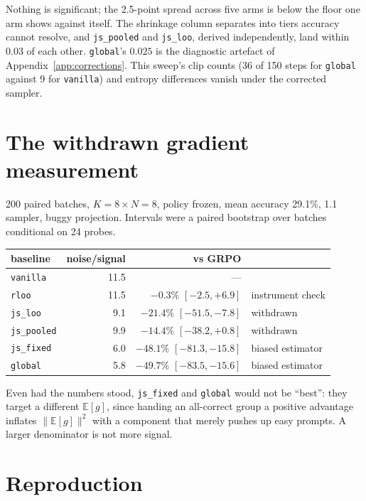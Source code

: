 \documentclass{article}
\newcommand{\E}{\mathbb{E}}
\newcommand{\arm}[1]{\texttt{#1}}
\begin{document}
Nothing is significant; the 2.5-point spread across five arms is below the
floor one arm shows against itself. The shrinkage column separates into
tiers accuracy cannot resolve, and \arm{js\_pooled} and \arm{js\_loo},
derived independently, land within $0.03$ of each other. \arm{global}'s
$0.025$ is the diagnostic artefact of Appendix~\ref{app:corrections}. This
sweep's clip counts (36 of 150 steps for \arm{global} against 9 for
\arm{vanilla}) and entropy differences vanish under the corrected sampler.

\section{The withdrawn gradient measurement}
\label{app:gradvar}

200 paired batches, $K=8\times N=8$, policy frozen, mean accuracy 29.1\%,
1.1 sampler, buggy projection. Intervals were a paired bootstrap over
batches conditional on 24 probes.

\begin{center}\small
\begin{tabular}{lrrl}
\toprule
baseline & noise/signal & vs GRPO & \\
\midrule
\arm{vanilla}    & 11.5 & ---                      & \\
\arm{rloo}       & 11.5 & $-0.3\%$ $[-2.5,+6.9]$   & instrument check \\
\arm{js\_loo}    & 9.1  & $-21.4\%$ $[-51.5,-7.8]$ & withdrawn \\
\arm{js\_pooled} & 9.9  & $-14.4\%$ $[-38.2,+0.8]$ & withdrawn \\
\arm{js\_fixed}  & 6.0  & $-48.1\%$ $[-81.3,-15.8]$& biased estimator \\
\arm{global}     & 5.8  & $-49.7\%$ $[-83.5,-15.6]$& biased estimator \\
\bottomrule
\end{tabular}
\end{center}

Even had the numbers stood, \arm{js\_fixed} and \arm{global} would not be
``best'': they target a different $\E[g]$, since handing an all-correct
group a positive advantage inflates $\lVert\E[g]\rVert^2$ with a component
that merely pushes up easy prompts. A larger denominator is not more
signal.

\section{Reproduction}
\end{document}
